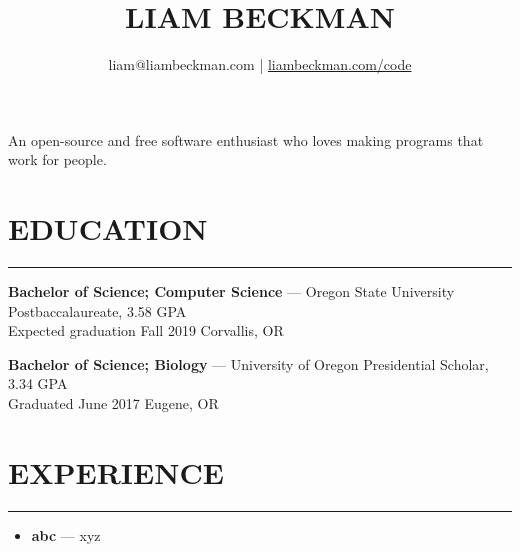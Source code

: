 


\title{\textcolor{my-red}{LIAM BECKMAN}}
\author{liam@liambeckman.com | \href{https://liambeckman.com/code}{liambeckman.com/code}}

\date{\vspace{-5ex}}



\maketitle

\begin{center}
An open-source and free software enthusiast who loves making programs that work for people.
\end{center}

\newcommand{\myTitle}[1] {
    \vspace{-1.5em}
    \section*{\large{#1}}\vspace{-1.7em}
    \textcolor{my-grey}{\rule{\linewidth}{0.5pt}}
    \vspace{-1em}
}

\newcommand{\showoff}[4] {
    \textcolor{my-blue}{\textbf{#1}} --- #2\\
    \textcolor{my-grey}{#3 \hfill #4}
    \medskip
}

\newcommand{\myBreak} {
    \textcolor{my-grey}{\dotfill}
    \smallskip
}

\newcommand{\myItem}[1] {
    \item\textcolor{my-blue}{\textbf{#1}} ---
}

\myTitle{EDUCATION}

\showoff
{Bachelor of Science; Computer Science}
{Oregon State University Postbaccalaureate, 3.58 GPA}
{Expected graduation Fall 2019}
{Corvallis, OR}

\myBreak

\showoff
{Bachelor of Science; Biology}
{University of Oregon Presidential Scholar, 3.34 GPA}
{Graduated June 2017}
{Eugene, OR}

\medbreak

\myTitle{EXPERIENCE}

\vspace{-1em}
\begin{itemize}[label=$\triangleright$]
    \myItem{abc}xyz
\end{itemize}

